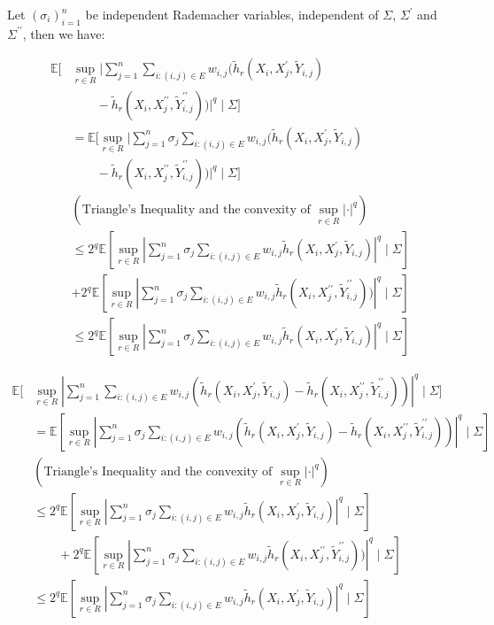 \documentclass[letterpaper]{article} %
\def\DoubleColumn{}
\def\DoubleColumnEnd{}
\def\SingleColumn{}
\def\SingleColumnEnd{}
\newcommand{\E}{\mathbb{E}}
\newcommand{\pair}[1]{(#1)}
\begin{document}
\SingleColumnEnd
Let $(\sigma_i)_{i=1}^n$ be independent Rademacher variables, independent of $\Sigma$, $\Sigma^\prime$ and $\Sigma^{\prime\prime}$, then we have:
\DoubleColumn
\begin{align*}
    \E[&\sup_{r\in R}|\sum_{j=1}^n \sum_{i:\pair{i,j}\in E} w_{i,j}(\tilde{h}_r(X_i,X_j^\prime,\tilde{Y}_{i,j})\\
    &\qquad-\tilde{h}_r(X_i,X_j^{\prime\prime},\tilde{Y}_{i,j}^{\prime\prime}))|^q\mid \Sigma]\\
    &= \E[\sup_{r\in R}|\sum_{j=1}^n \sigma_j \sum_{i:\pair{i,j}\in E} w_{i,j}(\tilde{h}_r(X_i,X_j^\prime,\tilde{Y}_{i,j})\\
    &\qquad-\tilde{h}_r(X_i,X_j^{\prime\prime},\tilde{Y}_{i,j}^{\prime\prime}))|^q\mid \Sigma]\\
    &(\text{Triangle's Inequality and the convexity of }\sup_{r\in R}|\cdot|^q)\\
    &\le 2^q\E[\sup_{r\in R}|\sum_{j=1}^n \sigma_j \sum_{i:\pair{i,j}\in E} w_{i,j}\tilde{h}_r(X_i,X_j^\prime,\tilde{Y}_{i,j})|^q\mid \Sigma]\\
    &+ 2^q\E[\sup_{r\in R}|\sum_{j=1}^n \sigma_j \sum_{i:\pair{i,j}\in E} w_{i,j}\tilde{h}_r(X_i,X_j^{\prime\prime},\tilde{Y}_{i,j}^{\prime\prime}))|^q\mid \Sigma]\\
    &\le 2^q\E[\sup_{r\in R}|\sum_{j=1}^n\sigma_j\sum_{i:\pair{i,j}\in E}w_{i,j} \tilde{h}_r(X_i,X_j^\prime,\tilde{Y}_{i,j})|^q\mid \Sigma]
\end{align*}
\DoubleColumnEnd
\SingleColumn
\begin{align*}
    \E[&\sup_{r\in R}|\sum_{j=1}^n \sum_{i:\pair{i,j}\in E} w_{i,j}(\tilde{h}_r(X_i,X_j^\prime,\tilde{Y}_{i,j})-\tilde{h}_r(X_i,X_j^{\prime\prime},\tilde{Y}_{i,j}^{\prime\prime}))|^q\mid \Sigma]\\
    &= \E[\sup_{r\in R}|\sum_{j=1}^n \sigma_j \sum_{i:\pair{i,j}\in E} w_{i,j}(\tilde{h}_r(X_i,X_j^\prime,\tilde{Y}_{i,j})-\tilde{h}_r(X_i,X_j^{\prime\prime},\tilde{Y}_{i,j}^{\prime\prime}))|^q\mid \Sigma]\\
    &(\text{Triangle's Inequality and the convexity of }\sup_{r\in R}|\cdot|^q)\\
    &\le 2^q\E[\sup_{r\in R}|\sum_{j=1}^n \sigma_j \sum_{i:\pair{i,j}\in E} w_{i,j}\tilde{h}_r(X_i,X_j^\prime,\tilde{Y}_{i,j})|^q\mid \Sigma]\\
    &\qquad+ 2^q\E[\sup_{r\in R}|\sum_{j=1}^n \sigma_j \sum_{i:\pair{i,j}\in E} w_{i,j}\tilde{h}_r(X_i,X_j^{\prime\prime},\tilde{Y}_{i,j}^{\prime\prime}))|^q\mid \Sigma]\\
    &\le 2^q\E[\sup_{r\in R}|\sum_{j=1}^n\sigma_j\sum_{i:\pair{i,j}\in E}w_{i,j} \tilde{h}_r(X_i,X_j^\prime,\tilde{Y}_{i,j})|^q\mid \Sigma]
\end{align*}
\end{document}
